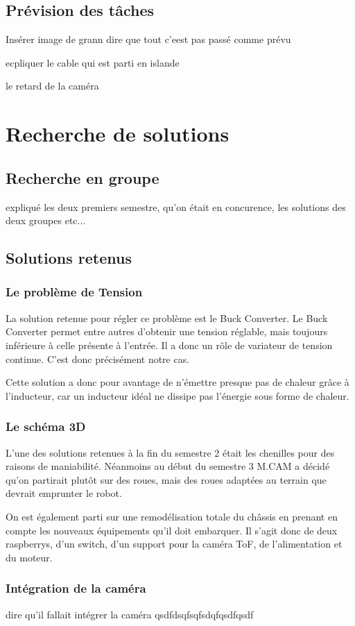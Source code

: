 \subsection{Prévision des tâches}


Insérer image de grann
dire que tout c'eest pas passé comme prévu

ecpliquer le cable qui est parti en islande


le retard de la caméra



\section{Recherche de solutions}

\subsection{Recherche en groupe}


expliqué les deux premiers semestre, qu'on était en concurence, les solutions des deux groupes etc...

\subsection{Solutions retenus}

\subsubsection{Le problème de Tension}

La solution retenue pour régler ce problème est le Buck Converter. Le Buck Converter permet entre autres d’obtenir une tension réglable, mais toujours inférieure à celle présente à l’entrée. Il a donc un rôle de variateur de tension continue. C’est donc précisément notre cas.

Cette solution a donc pour avantage de n’émettre presque pas de chaleur grâce à l’inducteur, car un inducteur idéal ne dissipe pas l’énergie sous forme de chaleur.

\subsubsection{Le schéma 3D}

L’une des solutions retenues à la fin du semestre 2  était les chenilles pour des raisons de maniabilité. 
Néanmoins au début du semestre 3 M.CAM a décidé qu’on partirait plutôt sur des roues, mais des roues adaptées au terrain que devrait emprunter le robot.

On est également parti sur une remodélisation totale du châssis en prenant en compte les nouveaux équipements qu’il doit embarquer. Il s’agit donc de deux raspberrys, d’un switch, d’un support pour la caméra ToF, de l’alimentation et du moteur. 

\subsubsection{Intégration de la caméra}

dire qu'il fallait intégrer la caméra qsdfdsqfsqfsdqfqsdfqsdf
